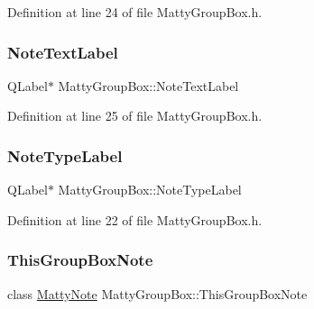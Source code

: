 Definition at line 24 of file Matty\+Group\+Box.\+h.

\hypertarget{classMattyGroupBox_a2243d04d95c060e516fa3a43f09f19ef}{}\label{classMattyGroupBox_a2243d04d95c060e516fa3a43f09f19ef} 
\subsubsection{\texorpdfstring{Note\+Text\+Label}{NoteTextLabel}}
{\footnotesize\ttfamily Q\+Label$\ast$ Matty\+Group\+Box\+::\+Note\+Text\+Label\hspace{0.3cm}{\ttfamily [private]}}



Definition at line 25 of file Matty\+Group\+Box.\+h.

\hypertarget{classMattyGroupBox_a7bd564ef71ea2331a316d2fc6792ef09}{}\label{classMattyGroupBox_a7bd564ef71ea2331a316d2fc6792ef09} 
\subsubsection{\texorpdfstring{Note\+Type\+Label}{NoteTypeLabel}}
{\footnotesize\ttfamily Q\+Label$\ast$ Matty\+Group\+Box\+::\+Note\+Type\+Label\hspace{0.3cm}{\ttfamily [private]}}



Definition at line 22 of file Matty\+Group\+Box.\+h.

\hypertarget{classMattyGroupBox_a00ca2ef39a0b5aca9e83373777bed395}{}\label{classMattyGroupBox_a00ca2ef39a0b5aca9e83373777bed395} 
\subsubsection{\texorpdfstring{This\+Group\+Box\+Note}{ThisGroupBoxNote}}
{\footnotesize\ttfamily class \hyperlink{classMattyNote}{Matty\+Note} Matty\+Group\+Box\+::\+This\+Group\+Box\+Note\hspace{0.3cm}{\ttfamily [private]}}



